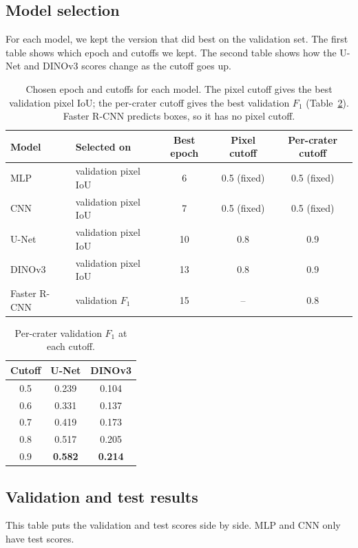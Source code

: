 \documentclass{article} %
\begin{document}
\clearpage
\subsection{Model selection}
\label{app:selection}
For each model, we kept the version that did best on the validation set. The first table shows which epoch and cutoffs we kept. The second table shows how the U-Net and DINOv3 scores change as the cutoff goes up.


\begin{table}[H]
  \centering
  \begin{tabular}{llccc}
    \toprule
    Model & Selected on & Best epoch & Pixel cutoff & Per-crater cutoff \\
    \midrule
    MLP & validation pixel IoU & 6 & 0.5 (fixed) & 0.5 (fixed) \\
    CNN & validation pixel IoU & 7 & 0.5 (fixed) & 0.5 (fixed) \\
    U-Net & validation pixel IoU & 10 & 0.8 & 0.9 \\
    DINOv3 & validation pixel IoU & 13 & 0.8 & 0.9 \\
    Faster R-CNN & validation $F_1$ & 15 & -- & 0.8 \\
    \bottomrule
  \end{tabular}
  \caption{Chosen epoch and cutoffs for each model. The pixel cutoff gives the best validation pixel IoU; the per-crater cutoff gives the best validation $F_1$ (Table~\ref{tab:app_cutoffs}). Faster R-CNN predicts boxes, so it has no pixel cutoff.}
  \label{tab:app_selection}
\end{table}

\begin{table}[H]
  \centering
  \begin{tabular}{ccc}
    \toprule
    Cutoff & U-Net & DINOv3 \\
    \midrule
    0.5 & 0.239 & 0.104 \\
    0.6 & 0.331 & 0.137 \\
    0.7 & 0.419 & 0.173 \\
    0.8 & 0.517 & 0.205 \\
    0.9 & \textbf{0.582} & \textbf{0.214} \\
    \bottomrule
  \end{tabular}
  \caption{Per-crater validation $F_1$ at each cutoff.}
  \label{tab:app_cutoffs}
\end{table}

\subsection{Validation and test results}
\label{app:valtest}
This table puts the validation and test scores side by side. MLP and CNN only have test scores.
\end{document}
